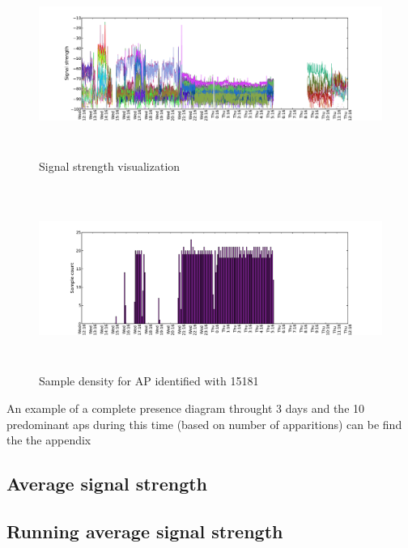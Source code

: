 \begin{figure}[h]
	\centering
	\includegraphics[width=12cm,height=6cm,keepaspectratio]{figures/complete_on_bssid15181_for_1.split/complete_on_bssid15181_for_1_1.pdf}
	\caption{Signal strength visualization}
	\label{fig:rssi_6_2nd_day}
\end{figure}
\begin{figure}[h]
	\includegraphics[width=12cm,height=6cm,keepaspectratio]{figures/complete_on_bssid15181_for_1.split/complete_on_bssid15181_for_1_2.pdf}
	\caption{Sample density for AP identified with 15181}
	\label{samples_6_2nd_day}
\end{figure}

An example of a complete presence diagram throught 3 days and the 10 predominant
aps during this time (based on number of apparitions) can be find the the
appendix %

\subsection{Average signal strength}
\subsection{Running average signal strength}
